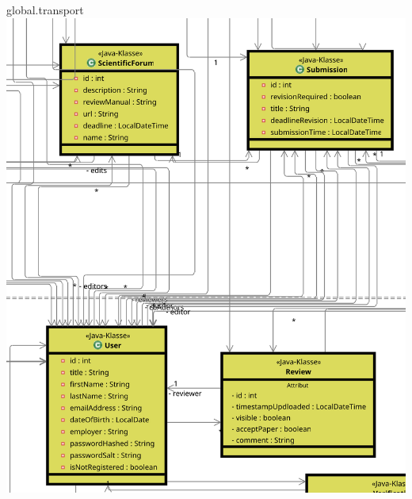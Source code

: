 \documentclass{beamer}
\begin{document}
    \begin{frame}{global.transport}
        \centering
        \includegraphics[height=0.9\textheight]{excerpts/Submission+User@3x}
    \end{frame}
\end{document}
